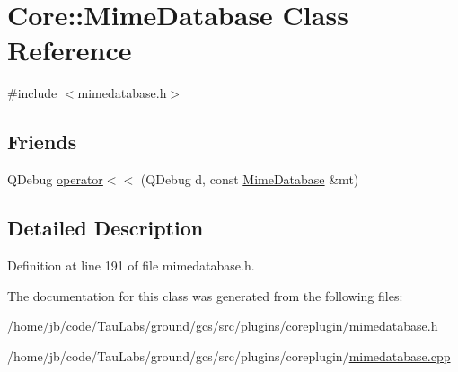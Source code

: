 \hypertarget{class_core_1_1_mime_database}{\section{\-Core\-:\-:\-Mime\-Database \-Class \-Reference}
\label{class_core_1_1_mime_database}
}


{\ttfamily \#include $<$mimedatabase.\-h$>$}

\subsection*{\-Friends}
\begin{DoxyCompactItemize}
\item 
\-Q\-Debug \hyperlink{group___core_plugin_gaa9ac23651f76ab5718a0afd635805cc4}{operator$<$$<$} (\-Q\-Debug d, const \hyperlink{class_core_1_1_mime_database}{\-Mime\-Database} \&mt)
\end{DoxyCompactItemize}


\subsection{\-Detailed \-Description}


\-Definition at line 191 of file mimedatabase.\-h.



\-The documentation for this class was generated from the following files\-:\begin{DoxyCompactItemize}
\item 
/home/jb/code/\-Tau\-Labs/ground/gcs/src/plugins/coreplugin/\hyperlink{mimedatabase_8h}{mimedatabase.\-h}\item 
/home/jb/code/\-Tau\-Labs/ground/gcs/src/plugins/coreplugin/\hyperlink{mimedatabase_8cpp}{mimedatabase.\-cpp}\end{DoxyCompactItemize}
